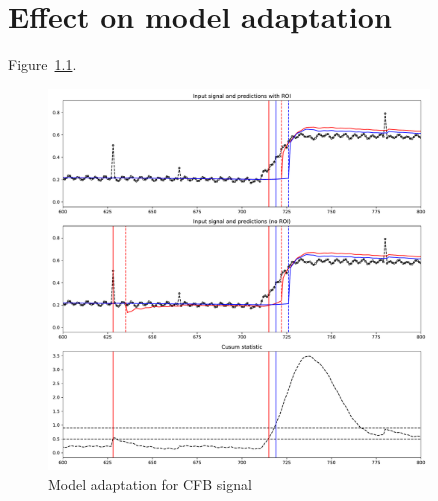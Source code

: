 \chapter{Effect on model adaptation}

Figure~\ref{fig:cfb_proof_of_concept}.
\begin{figure}[htb!]
	\centering
	\includegraphics[width=0.9\textwidth]{images/proof_of_concept_cfb}
  \caption{Model adaptation for CFB signal
	}\label{fig:cfb_proof_of_concept}
\end{figure}
